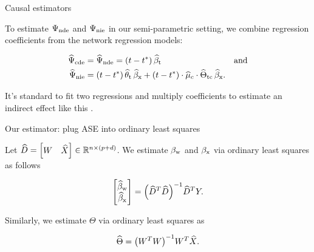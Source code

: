 \documentclass{beamer}
\theoremstyle{remark}
\begin{document}
\begin{frame}{Causal estimators}

    To estimate $\Psi_\text{nde}$ and $\Psi_\text{nie}$ in our semi-parametric setting, we combine regression coefficients from the network regression models:

    \begin{align*}
        \cdehat & = \ndehat = \paren*{t - t^*} \, \betathat                                                                              & \text{and} \\
        \niehat & = \paren*{t - t^*} \, \thetathat \, \betaxhat + \paren*{t - t^*} \cdot \widehat{\mu}_c \cdot \Thetatchat \, \betaxhat.
    \end{align*}

    It's standard to fit two regressions and multiply coefficients to estimate an indirect effect like this \citep{vanderweele_mediation_2014}.

\end{frame}


\begin{frame}{Our estimator: plug ASE into ordinary least squares}

    Let $\widehat{D} = \begin{bmatrix} W & \widehat{X} \end{bmatrix} \in \mathbb{R}^{n \times (p + d)}$. We estimate $\beta_\text{w}$ and $\beta_\text{x}$ via ordinary least squares as follows

    \begin{align*}
        \begin{bmatrix}
            \betawhat \\
            \betaxhat
        \end{bmatrix}
        = \paren*{\Dhat^T \Dhat}^{-1} \Dhat^T Y.
    \end{align*}

    Similarly, we estimate $\Theta$ via ordinary least squares as

    \begin{align*}
        \Thetahat
        = \paren*{\W^T \W}^{-1} \W^T \Xhat.
    \end{align*}
\end{frame}
\end{document}
